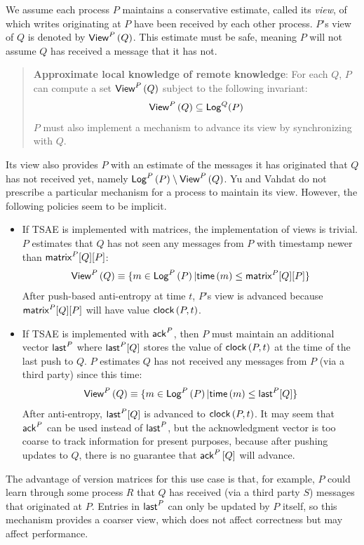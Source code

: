 \documentclass[]             %
{NASA}                       %
\theoremstyle{definition}
\begin{document}
We assume each process $P$ maintains a conservative estimate, called
its \emph{view}, of which writes originating at $P$ have been received
by each other process. $P$'s view of $Q$ is denoted by
$\mathsf{View}^{P}\left(Q\right)$. This estimate must be safe, meaning $P$ will not assume
$Q$ has received a message that it has not.
\begin{quote}
  \textbf{Approximate local knowledge of remote knowledge}: For each $Q$,
  $P$ can compute a set $\mathsf{View}^{P}\left(Q\right)$ subject to the following
  invariant:
  \begin{equation*}
    \mathsf{View}^{P}\left(Q\right) \subseteq \mathsf{Log}^{Q}(P)
  \end{equation*}
  $P$ must also implement a mechanism to advance its view by
  synchronizing with $Q$.
\end{quote}
Its view also provides $P$ with an estimate of the messages it has
originated that $Q$ has not received yet, namely
$\mathsf{Log}^{P}\left(P\right) \setminus \mathsf{View}^{P}\left(Q\right)$. Yu and Vahdat do not prescribe a
particular mechanism for a process to maintain its view. However, the
following policies seem to be implicit.
\begin{itemize}
\item If TSAE is implemented with matrices, the implementation of
  views is trivial. $P$ estimates that $Q$ has not seen any
  messages from $P$ with timestamp newer than $\mathsf{matrix}^{P}[Q][P]$:
  \begin{equation*}
    \mathsf{View}^{P}\left(Q\right) \equiv \{ m \in \mathsf{Log}^{P}\left(P\right) | \mathsf{time}\left(m\right) \leq
    \mathsf{matrix}^{P}[Q][P] \}
  \end{equation*}
  After push-based anti-entropy at time $t$, $P$'s view is advanced
  because $\mathsf{matrix}^{P}[Q][P]$ will have value $\mathsf{clock}\left(P, t\right)$.
\item If TSAE is implemented with $\mathsf{ack}^{P}{}$, then $P$ must
  maintain an additional vector $\mathsf{last}^{P}$ where
  $\mathsf{last}^{P}[Q]$ stores the value of $\mathsf{clock}\left(P,t\right)$ at the time
  of the last push to $Q$. $P$ estimates $Q$ has not received any
  messages from $P$ (via a third party) since this time:
  \begin{equation*}
    \mathsf{View}^{P}\left(Q\right) \equiv \{ m \in \mathsf{Log}^{P}\left(P\right) | \mathsf{time}\left(m\right) \leq
    \mathsf{last}^{P}[Q] \}
  \end{equation*}
  After anti-entropy, $\mathsf{last}^{P}[Q]$ is advanced to
  $\mathsf{clock}\left(P, t\right)$.  It may seem that $\mathsf{ack}^{P}$ can be used instead
  of $\mathsf{last}^{P}$, but the acknowledgment vector is too coarse to
  track information for present purposes, because after pushing
  updates to $Q$, there is no guarantee that $\mathsf{ack}^{P}\left[Q\right]$ will
  advance.
\end{itemize}
The advantage of version matrices for this use case is that, for
example, $P$ could learn through some process $R$ that $Q$ has
received (via a third party $S$) messages that originated at
$P$. Entries in $\mathsf{last}^{P}$ can only be updated by $P$ itself,
so this mechanism provides a coarser view, which does not affect
correctness but may affect performance.
\end{document}
